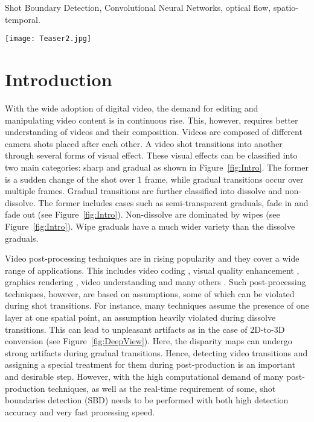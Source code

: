 \documentclass[journal]{IEEEtran}
\begin{document}
\begin{IEEEkeywords}
Shot Boundary Detection, Convolutional Neural Networks, optical flow, spatio-temporal.
\end{IEEEkeywords}






\IEEEpeerreviewmaketitle

\begin{figure*}
  \centering
   \texttt{[image: Teaser2.jpg]}
   \caption{Shot transitions are classified into two main categories: sharp and gradual. Gradual transitions are further classified into soft and wipes. Soft include semi-transparent, fade in and fade out. Wipes are the most ill defined form of transitions.}
\label{fig:Intro}
 \end{figure*}

\section{Introduction}

With the wide adoption of digital video, the demand for editing and manipulating video content is in continuous rise. This, however, requires better understanding of videos and their composition. Videos are composed of different camera shots placed after each other. A video shot transitions into another through several forms of visual effect. These visual effects can be classified into two main categories: sharp and gradual \cite{Smeaton10} as shown in Figure~\ref{fig:Intro}. The former is a sudden change of the shot over 1 frame, while gradual transitions occur over multiple frames. Gradual transitions are further classified into dissolve and non-dissolve. The former includes cases such as semi-transparent graduals, fade in and fade out (see Figure~\ref{fig:Intro}). Non-dissolve are dominated by wipes (see Figure~\ref{fig:Intro}). Wipe graduals have a much wider variety than the dissolve graduals. 


Video post-processing techniques are in rising popularity and they cover a wide range of applications. This includes video coding \cite{Fan00}, visual quality enhancement \cite{Xie16b,Kim16b}, graphics rendering \cite{Xie16a,Calagari15,Bae17}, video understanding \cite{Zhang16a,Zhang16b} and many others \cite{Song16,Templin14}. Such post-processing techniques, however, are based on assumptions, some of which can be violated during shot transitions. For instance, many techniques assume the presence of one layer at one spatial point, an assumption heavily violated during dissolve transitions. This can lead to unpleasant artifacts as in the case of 2D-to-3D conversion (see Figure~\ref{fig:DeepView}). Here, the disparity maps can undergo strong artifacts during gradual transitions. Hence, detecting video transitions and assigning a special treatment for them during post-production is an important and desirable step. However, with the high computational demand of many post-production techniques, as well as the real-time requirement of some, shot boundaries detection (SBD) needs to be performed with both high detection accuracy and very fast processing speed.    
\end{document}
